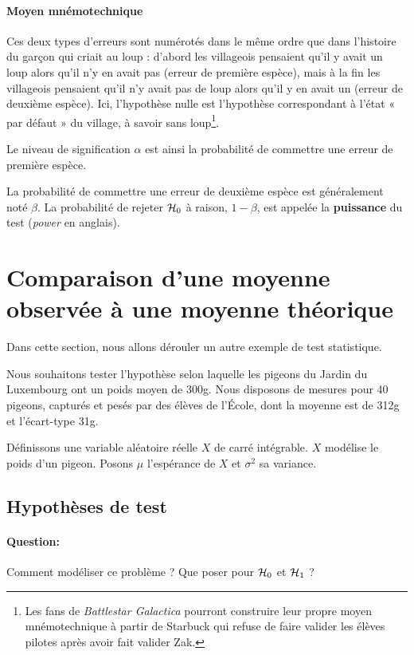 \paragraph{Moyen mnémotechnique} Ces deux types d'erreurs sont numérotés dans
le même ordre que dans l'histoire du garçon qui criait au loup : d'abord les
villageois pensaient qu'il y avait un loup alors qu'il n'y en avait pas (erreur
de première espèce), mais à la fin les villageois pensaient qu'il n'y avait pas
de loup alors qu'il y en avait un (erreur de deuxième espèce). Ici, l'hypothèse
nulle est l'hypothèse correspondant à l'état « par défaut » du village, à
savoir sans loup\footnote{Les fans de \textit{Battlestar Galactica} pourront
	construire leur propre moyen mnémotechnique à partir de Starbuck qui refuse
	de faire valider les élèves pilotes après avoir fait valider Zak.}.

Le niveau de signification $\alpha$ est ainsi la probabilité de commettre une
erreur de première espèce.

La probabilité de commettre une erreur de deuxième espèce est généralement noté
$\beta$. La probabilité de rejeter $\mathcal{H}_0$ à raison, $1-\beta$, est appelée la
\textbf{puissance} du test (\textit{power} en anglais).


\section{Comparaison d'une moyenne observée à une moyenne théorique}
\label{sec:test_moyenne}
Dans cette section, nous allons dérouler un autre exemple de test statistique. 

Nous souhaitons tester l'hypothèse selon laquelle les pigeons du Jardin du
Luxembourg ont un poids moyen de 300g. Nous disposons de mesures pour 40
pigeons, capturés et pesés par des élèves de l'École, dont la moyenne est de
312g et l'écart-type 31g.

Définissons une variable aléatoire réelle $X$ de carré intégrable. $X$ modélise
le poids d'un pigeon. Posons $\mu$ l'espérance de $X$ et $\sigma^2$ sa
variance.

\subsection{Hypothèses de test}
\paragraph{Question:} Comment modéliser ce problème ? Que poser pour $\mathcal{H}_0$ et
$\mathcal{H}_1$ ? %
\bigskip

